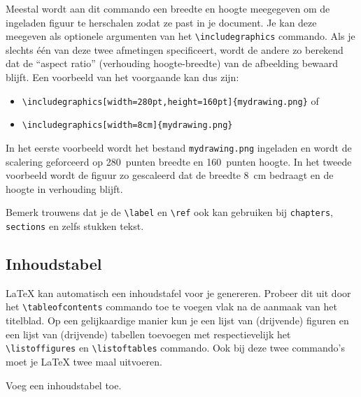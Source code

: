 \documentclass[12pt, dutch]{article}
\newcommand{\bs}{\textbackslash}
\begin{document}
Meestal wordt aan dit commando een breedte en hoogte meegegeven om de
ingeladen figuur te herschalen zodat ze past in je document. Je kan
deze meegeven als optionele argumenten van het \texttt{\bs{}includegraphics} commando.
Als je slechts \'e\'en van deze twee afmetingen specificeert, wordt de andere zo
berekend dat de ``aspect ratio'' (verhouding hoogte-breedte) van de afbeelding
bewaard blijft. Een voorbeeld van het voorgaande kan dus zijn:

\begin{itemize}
  \item \texttt{\bs{}includegraphics[width=280pt,height=160pt]\{mydrawing.png\}} of
  \item \texttt{\bs{}includegraphics[width=8cm]\{mydrawing.png\}}
\end{itemize}

In het eerste voorbeeld wordt het bestand \texttt{mydrawing.png} ingeladen en
wordt de scalering geforceerd op 280~punten breedte en 160~punten
hoogte. In het tweede voorbeeld wordt de figuur zo gescaleerd dat de
breedte 8~cm bedraagt en de hoogte in verhouding blijft.

Bemerk trouwens dat je de \texttt{\bs{}label} en \texttt{\bs{}ref} ook kan gebruiken bij
\texttt{chapters}, \texttt{sections} en zelfs stukken tekst.

\subsection{Inhoudstabel}

\LaTeX{} kan automatisch een inhoudstafel voor je genereren. Probeer
dit uit door het \texttt{\bs{}tableofcontents} commando toe
te voegen vlak na de aanmaak van het titelblad.  Op een
gelijkaardige manier kun je een lijst van (drijvende) figuren en een
lijst van (drijvende) tabellen toevoegen met respectievelijk het
\texttt{\bs{}listoffigures} en \texttt{\bs{}listoftables} commando.
Ook bij deze twee commando's moet je \LaTeX{} twee maal uitvoeren.
\begin{tcolorbox}[title=Opgave 5i]
  Voeg een inhoudstabel toe.
\end{tcolorbox}
\end{document}
